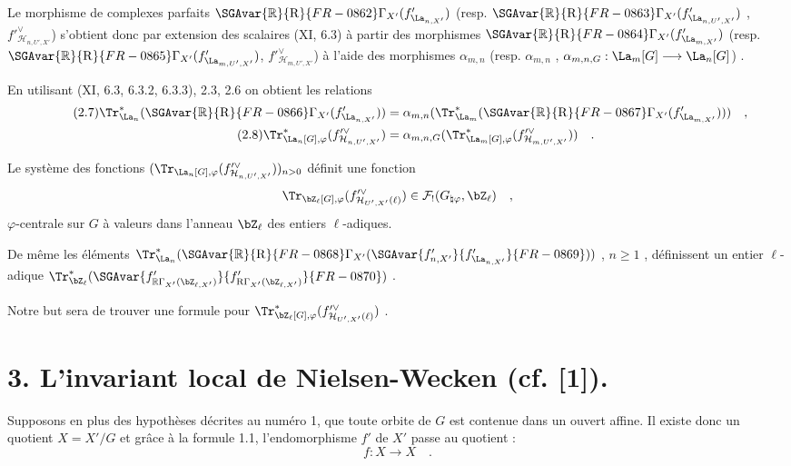 Le morphisme de complexes parfaits $\SGAvar{\mathbb{R}}{\mathrm{R}}{FR-0862}\Gamma_{X'}(f'_{\La_{n,X'}})$ (resp. $\SGAvar{\mathbb{R}}{\mathrm{R}}{FR-0863}\Gamma_{X'}(f'_{\La_{n,U',X'}})$ , $f'^\vee_{\mathcal{H}_{n,U',X'}}$) s'obtient donc par extension des scalaires (XI, 6.3) à partir des morphismes $\SGAvar{\mathbb{R}}{\mathrm{R}}{FR-0864}\Gamma_{X'}(f'_{\La_{m,X'}})$ (resp. $\SGAvar{\mathbb{R}}{\mathrm{R}}{FR-0865}\Gamma_{X'}(f'_{\La_{m,U',X'}})$, $f'^\vee_{\mathcal{H}_{m,U',X'}}$) 
à l'aide des morphismes $\alpha_{m,n}$ (resp. $\alpha_{m,n}$ , $\alpha_{m,n,G} : \La_m[G] \longrightarrow \La_n[G]$) .

En utilisant (XI, 6.3, 6.3.2, 6.3.3), 2.3, 2.6 on obtient les relations
\begin{align}
\tag{2.7} \Tr^*_{\La_n}(\SGAvar{\mathbb{R}}{\mathrm{R}}{FR-0866}\Gamma_{X'}(f'_{\La_{n,X'}})) &= \alpha_{m,n}(\Tr^*_{\La_m}(\SGAvar{\mathbb{R}}{\mathrm{R}}{FR-0867}\Gamma_{X'}(f'_{\La_{m,X'}}))) \quad , \\
\tag{2.8} \Tr^*_{\La_n[G],\varphi}(f'^\vee_{\mathcal{H}_{n,U',X'}}) &= \alpha_{m,n,G}(\Tr^*_{\La_m[G],\varphi}(f'^\vee_{\mathcal{H}_{m,U',X'}})) \quad .
\end{align}

Le système des fonctions $(\Tr_{\La_n[G],\varphi}(f'^\vee_{\mathcal{H}_{n,U',X'}}))_{n>0}$ définit une fonction
\[
\Tr_{\bZ_\ell[G],\varphi}(f'^\vee_{\mathcal{H}_{U',X'}(\ell)}) \in \mathcal{F}_!(G_{\natural\varphi}, \bZ_\ell) \quad ,
\]
$\varphi$-centrale sur $G$ à valeurs dans l'anneau $\bZ_\ell$ des entiers $\ell$-adiques.

De même les éléments $\Tr^*_{\La_n}(\SGAvar{\mathbb{R}}{\mathrm{R}}{FR-0868}\Gamma_{X'}(\SGAvar{f'_{n,X'}}{f'_{\La_{n,X'}}}{FR-0869}))$ , $n \geq 1$ , définissent un entier $\ell$-adique $\Tr^*_{\bZ_\ell}(\SGAvar{f'_{\mathbb{R}\Gamma_{X'}(\bZ_{\ell,X'})}}{f'_{\mathrm{R}\Gamma_{X'}(\bZ_{\ell,X'})}}{FR-0870})$ .

Notre but sera de trouver une formule pour $\Tr^*_{\bZ_\ell[G],\varphi}(f'^\vee_{\mathcal{H}_{U',X'}(\ell)})$ .


\section*{3. L'invariant local de Nielsen-Wecken (cf. [1]).}
Supposons en plus des hypothèses décrites au numéro 1, que toute orbite de $G$ est contenue dans un ouvert affine. Il existe donc un quotient $X = X'/G$ et grâce à la formule 1.1, l'endomorphisme $f'$ de $X'$ passe au quotient :
\[
f : X \longrightarrow X \quad .
\]

